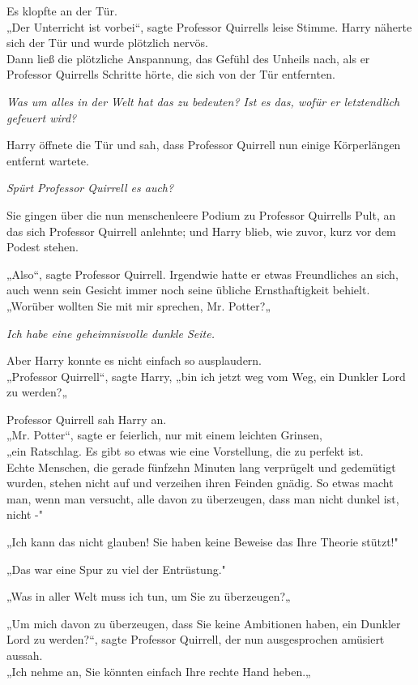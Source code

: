 {Es klopfte an der Tür.\\ „Der Unterricht ist vorbei“, sagte Professor Quirrells leise Stimme. Harry näherte sich der Tür und wurde plötzlich nervös.\\ Dann ließ die plötzliche Anspannung, das Gefühl des Unheils nach, als er Professor Quirrells Schritte hörte, die sich von der Tür entfernten.

\emph{Was um alles in der Welt hat das zu bedeuten? Ist es das, wofür er letztendlich gefeuert wird?}

Harry öffnete die Tür und sah, dass Professor Quirrell nun einige Körperlängen entfernt wartete.

\emph{Spürt Professor Quirrell es auch?}

Sie gingen über die nun menschenleere Podium zu Professor Quirrells Pult, an das sich Professor Quirrell anlehnte; und Harry blieb, wie zuvor, kurz vor dem Podest stehen.

„Also“, sagte Professor Quirrell. Irgendwie hatte er etwas Freundliches an sich, auch wenn sein Gesicht immer noch seine übliche Ernsthaftigkeit behielt.\\ „Worüber wollten Sie mit mir sprechen, Mr. Potter?„

\emph{Ich habe eine geheimnisvolle dunkle Seite.}

Aber Harry konnte es nicht einfach so ausplaudern.\\ „Professor Quirrell“, sagte Harry, „bin ich jetzt weg vom Weg, ein Dunkler Lord zu werden?„

Professor Quirrell sah Harry an.\\ „Mr. Potter“, sagte er feierlich, nur mit einem leichten Grinsen,\\ „ein Ratschlag. Es gibt so etwas wie eine Vorstellung, die zu perfekt ist.\\ Echte Menschen, die gerade fünfzehn Minuten lang verprügelt und gedemütigt wurden, stehen nicht auf und verzeihen ihren Feinden gnädig. So etwas macht man, wenn man versucht, alle davon zu überzeugen, dass man nicht dunkel ist, nicht -"

„Ich kann das nicht glauben! Sie haben keine Beweise das Ihre Theorie stützt!"

„Das war eine Spur zu viel der Entrüstung."

„Was in aller Welt muss ich tun, um Sie zu überzeugen?„

„Um mich davon zu überzeugen, dass Sie keine Ambitionen haben, ein Dunkler Lord zu werden?“, sagte Professor Quirrell, der nun ausgesprochen amüsiert aussah.\\ „Ich nehme an, Sie könnten einfach Ihre rechte Hand heben.„

}

